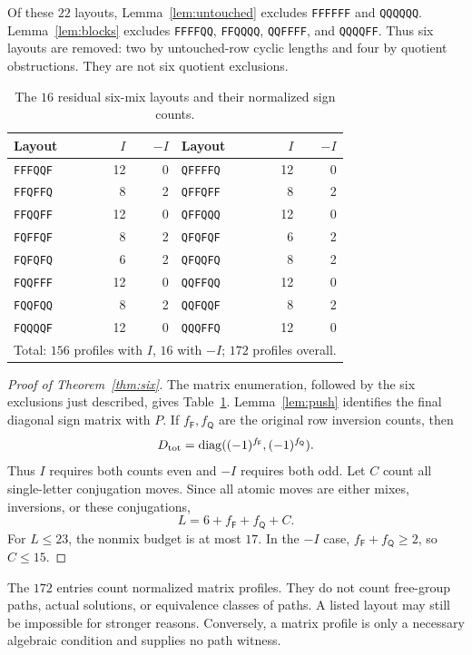 \documentclass[11pt,a4paper]{article}
\theoremstyle{definition}\newtheorem{definition}[theorem]{Definition}
\theoremstyle{remark}\newtheorem{remark}[theorem]{Remark}
\newcommand{\diag}{\operatorname{diag}}
\newcommand{\F}{\mathsf F}
\newcommand{\Q}{\mathsf Q}
\newcommand{\word}[1]{\texttt{#1}}
\begin{document}
Of these $22$ layouts, Lemma~\ref{lem:untouched} excludes \word{FFFFFF} and \word{QQQQQQ}. Lemma~\ref{lem:blocks} excludes \word{FFFFQQ}, \word{FFQQQQ}, \word{QQFFFF}, and \word{QQQQFF}. Thus six layouts are removed: two by untouched-row cyclic lengths and four by quotient obstructions. They are not six quotient exclusions.

\begin{table}[H]\centering
\caption{The $16$ residual six-mix layouts and their normalized sign counts.}\label{tab:six}
\begin{tabular}{lrr@{\qquad}lrr}\toprule
Layout & $I$ & $-I$ & Layout & $I$ & $-I$\\\midrule
\word{FFFQQF}&12&0&\word{QFFFFQ}&12&0\\
\word{FFQFFQ}&8&2&\word{QFFQFF}&8&2\\
\word{FFQQFF}&12&0&\word{QFFQQQ}&12&0\\
\word{FQFFQF}&8&2&\word{QFQFQF}&6&2\\
\word{FQFQFQ}&6&2&\word{QFQQFQ}&8&2\\
\word{FQQFFF}&12&0&\word{QQFFQQ}&12&0\\
\word{FQQFQQ}&8&2&\word{QQFQQF}&8&2\\
\word{FQQQQF}&12&0&\word{QQQFFQ}&12&0\\\midrule
\multicolumn{6}{c}{Total: $156$ profiles with $I$, $16$ with $-I$; $172$ profiles overall.}\\\bottomrule
\end{tabular}
\end{table}

\begin{proof}[Proof of Theorem~\ref{thm:six}]
The matrix enumeration, followed by the six exclusions just described, gives Table~\ref{tab:six}. Lemma~\ref{lem:push} identifies the final diagonal sign matrix with $P$. If $f_\F,f_\Q$ are the original row inversion counts, then
\[
 D_{\rm tot}=\diag((-1)^{f_\F},(-1)^{f_\Q}).
\]
Thus $I$ requires both counts even and $-I$ requires both odd. Let $C$ count all single-letter conjugation moves. Since all atomic moves are either mixes, inversions, or these conjugations,
\[
 L=6+f_\F+f_\Q+C.
\]
For $L\le23$, the nonmix budget is at most $17$. In the $-I$ case, $f_\F+f_\Q\ge2$, so $C\le15$.
\end{proof}

The $172$ entries count normalized matrix profiles. They do not count free-group paths, actual solutions, or equivalence classes of paths. A listed layout may still be impossible for stronger reasons. Conversely, a matrix profile is only a necessary algebraic condition and supplies no path witness.
\end{document}
